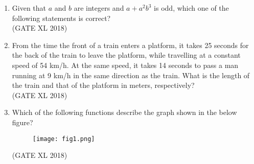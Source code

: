 \documentclass[14pt]{extarticle}
\begin{document}
\begin{flushleft}
\begin{enumerate}
\item Given that $a$ and $b$ are integers and $a + a^2 b^3$ is odd, which one of the following statements is correct?\\
\hfill(GATE XL 2018)\\
\begin{enumerate}
\end{enumerate}

\item From the time the front of a train enters a platform, it takes 25 seconds for the back of the train to leave the platform, while travelling at a constant speed of 54 km/h. At the same speed, it takes 14 seconds to pass a man running at 9 km/h in the same direction as the train. What is the length of the train and that of the platform in meters, respectively?\\
\hfill(GATE XL 2018)\\
\begin{enumerate}
\end{enumerate}

\item Which of the following functions describe the graph shown in the below figure?\\
\begin{figure}
    \centering
    \texttt{[image: fig1.png]}
    \caption{}
    \label{fig:q9}
\end{figure}

 \hfill(GATE XL 2018)\\
 \begin{enumerate}
 \end{enumerate}


\end{enumerate}
\end{flushleft}
\end{document}
